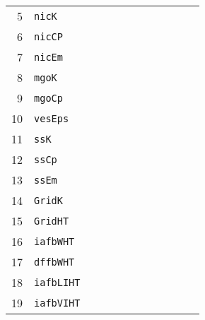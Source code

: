 \begin{table*}[!htbp]
\begin{tabular}{@{}rlrrrrrrrrrc@{}}
\footnotesize{5}   & \footnotesize{\texttt{nicK}}       &          &          &          &          &     &     & &          &     &     \\
\footnotesize{6}   & \footnotesize{\texttt{nicCP}}      &          &          &          &          &     &     & &          &     &     \\
\footnotesize{7}   & \footnotesize{\texttt{nicEm}}      &          &          &          &          &     &     & &          &     &     \\
\footnotesize{8}   & \footnotesize{\texttt{mgoK}}       &          &          &          &          &     &     & &          &     &     \\
\footnotesize{9}   & \footnotesize{\texttt{mgoCp}}      &          &          &          &          &     &     & &          &     &     \\
\footnotesize{10}  & \footnotesize{\texttt{vesEps}}     &          &          &          &          &     &     & &          &     &     \\
\footnotesize{11}  & \footnotesize{\texttt{ssK}}        &          &          &          &          &     &     & &          &     &     \\
\footnotesize{12}  & \footnotesize{\texttt{ssCp}}       &          &          &          &          &     &     & &          &     &     \\
\footnotesize{13}  & \footnotesize{\texttt{ssEm}}       &          &          &          &          &     &     & &          &     &     \\
\footnotesize{14}  & \footnotesize{\texttt{GridK}}      &          &          &          &          &     &     & &          &     &     \\
\footnotesize{15}  & \footnotesize{\texttt{GridHT}}     &          &          &          &          &     &     & &          &     &      \\
\footnotesize{16}  & \footnotesize{\texttt{iafbWHT}}    &          &          &          &          &     &     & &          &     &     \\
\footnotesize{17}  & \footnotesize{\texttt{dffbWHT}}    &          &          &          &          &     &     & &          &     &     \\
\footnotesize{18}  & \footnotesize{\texttt{iafbLIHT}}   &          &          &          &          &     &     & &          &     &     \\
\footnotesize{19}  & \footnotesize{\texttt{iafbVIHT}}   &          &          &          &          &     &     & &          &     &     \\

\end{tabular}
\end{table*}
